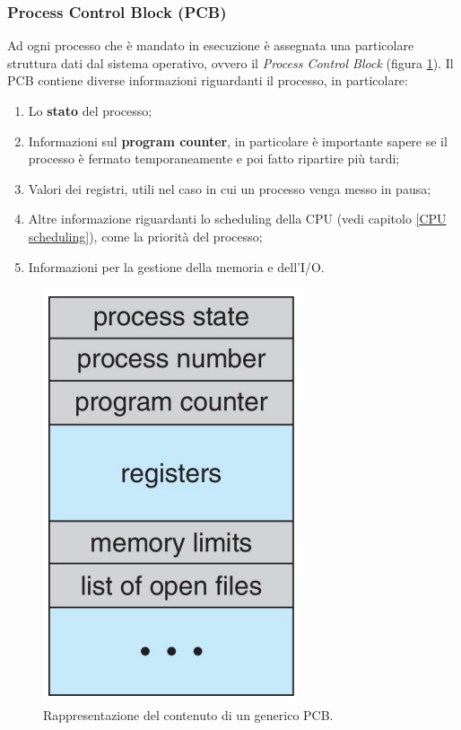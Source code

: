 % 
\subsubsection{Process Control Block (PCB)}\label{PCB}
Ad ogni processo che è mandato in esecuzione è assegnata una particolare struttura dati dal sistema operativo, ovvero il \textit{Process Control Block} (figura \ref{fig:PCB}). Il PCB contiene diverse informazioni riguardanti il processo, in particolare:
\vspace{-5px}
\begin{enumerate}
\setlength{\itemsep}{-.15 em}
    \item Lo \textbf{stato} del processo;
    \item Informazioni sul \textbf{program counter}, in particolare è importante sapere se il processo è fermato temporaneamente e poi fatto ripartire più tardi;
    \item Valori dei registri, utili nel caso in cui un processo venga messo in pausa;
    \item Altre informazione riguardanti lo scheduling della CPU (vedi capitolo \ref{CPU scheduling}), come la priorità del processo;
    \item Informazioni per la gestione della memoria e dell'I/O.
\end{enumerate}
\begin{figure}[h]
    \centering
    \includegraphics[width = .20\textwidth]{../res/imgs/processes/PCB.png}
    \caption{Rappresentazione del contenuto di un generico PCB.}
    \label{fig:PCB}
\end{figure}

